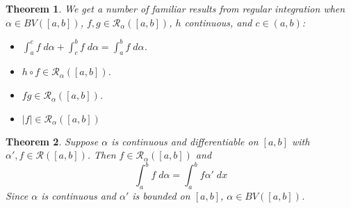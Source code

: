 \documentclass[12pt]{article}
\theoremstyle{plain}
\newtheorem{thm}{Theorem}[subsection]
\theoremstyle{definition}
\theoremstyle{remark}
\begin{document}
\begin{thm}
We get a number of familiar results from regular integration when $\alpha\in BV([a,b])$, $f,g\in\mathscr{R}_\alpha([a,b])$, $h$ continuous, and $c\in(a,b)$:
\begin{itemize}
    \item $\int^c_a f\;d\alpha + \int^b_c f\;d\alpha = \int^b_a f\;d\alpha$.
    \item $h\circ f\in\mathscr{R}_\alpha([a,b])$.
    \item $fg\in\mathscr{R}_\alpha([a,b])$.
    \item $|f|\in\mathscr{R}_\alpha([a,b])$
\end{itemize}
\end{thm}

\begin{thm}
\label{ftcbasis}
Suppose $\alpha$ is continuous and differentiable on $[a,b]$ with $\alpha', f\in\mathscr{R}([a,b])$. Then $f\in\mathscr{R}_\alpha([a,b])$ and
    \[ \int^b_a f\;d\alpha = \int^b_a f \alpha'\;dx\]
Since $\alpha$ is continuous and $\alpha'$ is bounded on $[a,b]$, $\alpha \in BV([a,b])$. 
\end{thm}
\end{document}
